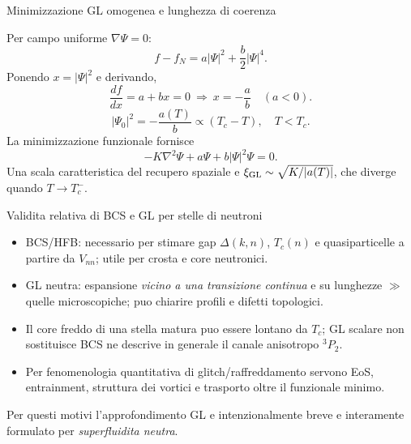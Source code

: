 \begin{frame}[t]{Minimizzazione GL omogenea e lunghezza di coerenza}
\vspace*{3mm}
\small

Per campo uniforme $\nabla\Psi=0$:
\[
f-f_N=a|\Psi|^2+\frac b2|\Psi|^4.
\]
Ponendo $x=|\Psi|^2$ e derivando,
\[
\frac{df}{dx}=a+bx=0
\ \Longrightarrow\ x=-\frac ab\quad(a<0).
\]
\[
\boxed{|\Psi_0|^2=-\frac{a(T)}b\propto(T_c-T),\quad T<T_c.}
\]
La minimizzazione funzionale fornisce
\[
\boxed{-K\nabla^2\Psi+a\Psi+b|\Psi|^2\Psi=0.}
\]
Una scala caratteristica del recupero spaziale e $\xi_{\rm GL}\sim\sqrt{K/|a(T)|}$, che diverge quando $T\to T_c^-$.
\end{frame}

\begin{frame}[t]{Validita relativa di BCS e GL per stelle di neutroni}
\vspace*{3mm}
\small

\begin{itemize}
\item BCS/HFB: necessario per stimare gap $\Delta(k,n)$, $T_c(n)$ e quasiparticelle a partire da $V_{nn}$; utile per crosta e core neutronici.
\item GL neutra: espansione \emph{vicino a una transizione continua} e su lunghezze $\gg$ quelle microscopiche; puo chiarire profili e difetti topologici.
\item Il core freddo di una stella matura puo essere lontano da $T_c$; GL scalare non sostituisce BCS ne descrive in generale il canale anisotropo ${}^3P_2$.
\item Per fenomenologia quantitativa di glitch/raffreddamento servono EoS, entrainment, struttura dei vortici e trasporto oltre il funzionale minimo.
\end{itemize}
Per questi motivi l'approfondimento GL e intenzionalmente breve e interamente formulato per \emph{superfluidita neutra}.
\end{frame}

